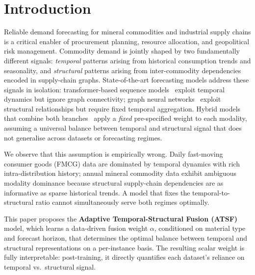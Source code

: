 
\section{Introduction}
\label{sec:intro}

Reliable demand forecasting for mineral commodities and industrial
supply chains is a critical enabler of procurement planning,
resource allocation, and geopolitical risk management. Commodity
demand is jointly shaped by two fundamentally different signals:
\textit{temporal} patterns arising from historical consumption
trends and seasonality, and \textit{structural} patterns arising
from inter-commodity dependencies encoded in supply-chain graphs.
State-of-the-art forecasting models address these signals in
isolation: transformer-based sequence models~\cite{lim2021tft}
exploit temporal dynamics but ignore graph connectivity; graph neural
networks~\cite{velickovic2018gat,wu2021gnn} exploit structural
relationships but require fixed temporal aggregation. Hybrid models
that combine both branches~\cite{ding2023mstgat} apply a
\textit{fixed} pre-specified weight to each modality, assuming a
universal balance between temporal and structural signal that does
not generalise across datasets or forecasting regimes.

We observe that this assumption is empirically wrong. Daily
fast-moving consumer goods (FMCG) data are dominated by temporal
dynamics with rich intra-distribution history; annual mineral
commodity data exhibit ambiguous modality dominance because
structural supply-chain dependencies are as informative as
sparse historical trends. A model that fixes the temporal-to-structural
ratio cannot simultaneously serve both regimes optimally.

This paper proposes the \textbf{Adaptive Temporal-Structural Fusion
(ATSF)} model, which learns a data-driven fusion weight $\alpha$,
conditioned on material type and forecast horizon, that determines
the optimal balance between temporal and structural representations
on a per-instance basis. The resulting scalar weight is fully
interpretable: post-training, it directly quantifies each dataset's
reliance on temporal vs.\ structural signal.

